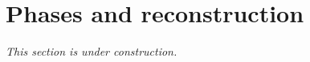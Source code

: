 \section{Phases and reconstruction}\label{sec:partII-H}

\emph{This section is under construction.}

